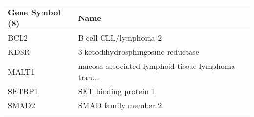 \begin{tabular}{ll}
\toprule
Gene Symbol (8) &                                               Name \\
\midrule
           BCL2 &                              B-cell CLL/lymphoma 2 \\
           KDSR &                 3-ketodihydrosphingosine reductase \\
          MALT1 & mucosa associated lymphoid tissue lymphoma tran... \\
         SETBP1 &                              SET binding protein 1 \\
          SMAD2 &                               SMAD family member 2 \\
\bottomrule
\end{tabular}
